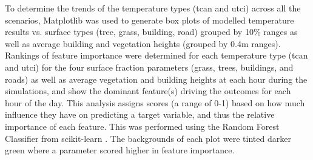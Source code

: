 \documentclass[final,3p,times,authoryear]{elsarticle}
\begin{document}
%


To determine the trends of the temperature types (\gls{tcan} and \gls{utci}) across all the scenarios, Matplotlib \citep{Hunter2007} was used to generate box plots of modelled temperature results vs. surface types (tree, grass, building, road) grouped by 10\% ranges as well as average building and vegetation heights (grouped by 0.4m ranges). Rankings of feature importance were determined for each temperature type (\gls{tcan} and \gls{utci}) for the four surface fraction parameters (grass, trees, buildings, and roads) as well as average vegetation and building heights at each hour during the simulations, and show the dominant feature(s) driving the outcomes for each hour of the day. This analysis assigns scores (a range of 0-1) based on how much influence they have on predicting a target variable, and thus the relative importance of each feature. This was performed using the Random Forest Classifier from  scikit-learn \citep{scikit-learn}. The backgrounds of each plot were tinted darker green where a parameter scored higher in feature importance. 
\end{document}
